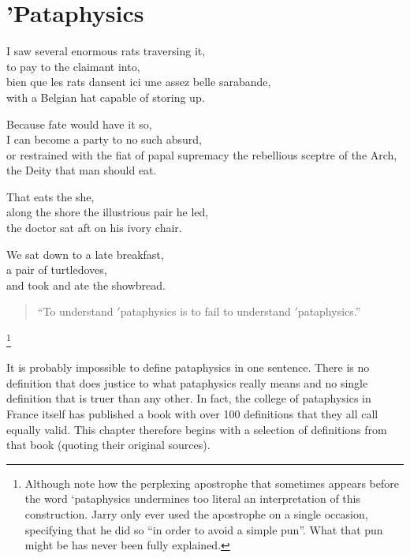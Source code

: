 
\chapter[Pataphysics]{'Pataphysics}
\label{ch:pataphysics}

\startcontents[chapters]

I saw several enormous rats traversing it, \\
to pay to the claimant into, \\
bien que les rats dansent ici une assez belle sarabande, \\
with a Belgian hat capable of storing up.

Because fate would have it so, \\
I can become a party to no such absurd, \\
or restrained with the fiat of papal supremacy the rebellious sceptre of the Arch, \\
the Deity that man should eat.

That eats the she, \\
along the shore the illustrious pair he led, \\
the doctor sat aft on his ivory chair.

We sat down to a late breakfast, \\
a pair of turtledoves, \\
and took and ate the showbread.

\vfill
\minicontents
\newpage

\begin{quote}
  ``To understand $'$pataphysics is to fail to understand $'$pataphysics.'' \autocite{Hugill2012a}
\end{quote}

\footnote{Although note how the perplexing apostrophe that sometimes appears before the word ‘pataphysics undermines too literal an interpretation of this construction. Jarry only ever used the apostrophe on a single occasion, specifying that he did so ``in order to avoid a simple pun''. What that pun might be has never been fully explained.}

It is probably impossible to define pataphysics in one sentence. There is no definition that does justice to what pataphysics really means and no single definition that is truer than any other. In fact, the college of pataphysics in France itself has published a book \autocite{Brotchie2003} with over 100 definitions that they all call equally valid. This chapter therefore begins with a selection of definitions from that book (quoting their original sources).


